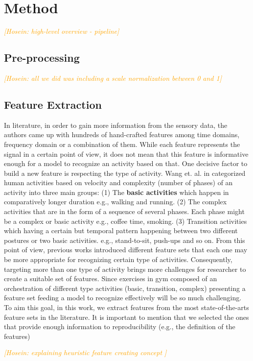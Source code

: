 \documentclass[journal,article,submit,moreauthors,pdftex]{Definitions/mdpi}
\newcommand{\hosein}[1]{\textcolor{orange}{{\it [Hosein: #1]}}}
\begin{document}
\section{Method}
\hosein{high-level overview - pipeline}
\subsection{Pre-processing}
\hosein{all we did was including a scale normalization between 0 and 1}
\subsection{Feature Extraction}
In literature, in order to gain more information from the sensory data, the authors came up with hundreds of hand-crafted features among time domains, frequency domain or a combination of them. While each feature represents the signal in a certain point of view, it does not mean that this feature is informative enough for a model to recognize an activity based on that. One decisive factor to build a new feature is respecting the type of activity. Wang et. al. in \cite{wang2019survey} categorized human activities based on velocity and complexity (number of phases) of an activity into three main groups: (1) The \textbf{basic activities} which happen in comparatively longer duration e.g., walking and running. (2)  The complex activities that are in the form of a sequence of several phases. Each phase might be a complex or basic activity e.g., coffee time, smoking. (3) Transition activities which having a certain but temporal pattern happening between two different postures or two basic activities. e.g., stand-to-sit, push-ups and so on. From this point of view, previous works introduced  different feature sets that each one may be more appropriate for recognizing certain type of activities. Consequently, targeting more than one type of activity brings more challenges for researcher to create a suitable set of features. Since exercises in gym composed of an orchestration of different type activities (basic, transition, complex) presenting a feature set feeding a model to recognize effectively will be so much challenging. To aim this goal, in this work, we extract features from the most state-of-the-arts feature sets in the literature. It is important to mention that we selected the ones that provide enough information to reproducibility (e.g., the definition of the features)



\hosein{explaining heuristic feature creating concept }
\end{document}

